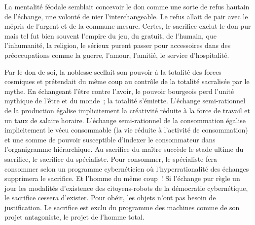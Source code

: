 \documentclass[french,twoside]{book} %
\newcommand{\astermono}{\medskip\centerline{\color{rubric}\large\selectfont{\syms ✻}}\medskip\par}%
\begin{document}
\noindent La mentalité féodale semblait concevoir le don comme une sorte de refus hautain de l’échange, une volonté de nier l’interchangeable. Le refus allait de pair avec le mépris de l’argent et de la commune mesure. Certes, le sacrifice exclut le don pur mais tel fut bien souvent l’empire du jeu, du gratuit, de l’humain, que l’inhumanité, la religion, le sérieux purent passer pour accessoires dans des préoccupations comme la guerre, l’amour, l’amitié, le service d’hospitalité.\par
Par le don de soi, la noblesse scellait son pouvoir à la totalité des forces cosmiques et prétendait du même coup au contrôle de la totalité sacralisée par le mythe. En échangeant l’être contre l’avoir, le pouvoir bourgeois perd l’unité mythique de l’être et du monde ; la totalité s’émiette. L’échange semi-rationnel de la production égalise implicitement la créativité réduite à la force de travail et un taux de salaire horaire. L’échange semi-rationnel de la consommation égalise implicitement le vécu consommable (la vie réduite à l’activité de consommation) et une somme de pouvoir susceptible d’indexer le consommateur dans l’organigramme hiérarchique. Au sacrifice du maître succède le stade ultime du sacrifice, le sacrifice du spécialiste. Pour consommer, le spécialiste fera consommer selon un programme cybernéticien où l’hyperrationalité des échanges supprimera le sacrifice. Et l’homme du même coup ! Si l’échange pur règle un jour les modalités d’existence des citoyens-robots de la démocratie cybernétique, le sacrifice cessera d’exister. Pour obéir, les objets n’ont pas besoin de justification. Le sacrifice est exclu du programme des machines comme de son projet antagoniste, le projet de l’homme total.\par

\astermono
\end{document}
